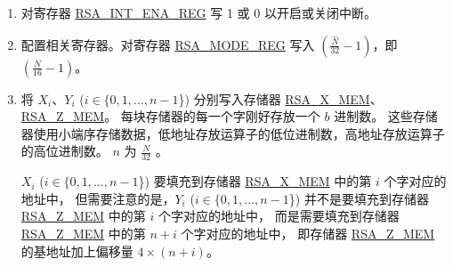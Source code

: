 \documentclass[main\_\_CN.tex]{subfiles}
\begin{document}
\begin{enumerate}

    \item 对寄存器 \hyperref[regdesc:RSAINTENAREG]{RSA\_INT\_ENA\_REG} 写 1 或 0 以开启或关闭中断。

    \item 配置相关寄存器。对寄存器 \hyperref[regdesc:RSAMODEREG]{RSA\_MODE\_REG} 写入 \begin{math}( \frac{\hat{N}}{32} - 1 )\end{math}，即 \begin{math}(  \frac{N}{16} - 1 )\end{math}。

    \item 将 \begin{math}{X}_{i}\end{math}、\begin{math}{Y}_{i}\end{math} (\begin{math}i \in \{ 0, 1, \dots, n-1 \end{math}\}) 分别写入存储器 \hyperref[regdesc:RSAmemory]{RSA\_X\_MEM}、\hyperref[regdesc:RSAmemory]{RSA\_Z\_MEM}。
        每块存储器的每一个字刚好存放一个 \begin{math}b\end{math} 进制数。
        这些存储器使用小端序存储数据，低地址存放运算子的低位进制数，高地址存放运算子的高位进制数。
        \begin{math}n\end{math} 为 \begin{math} \frac{N}{32} \end{math} 。

         \begin{math}{X}_{i}\end{math} (\begin{math}i \in \{ 0, 1, \dots, n-1 \end{math}\}) 要填充到存储器 \hyperref[regdesc:RSAmemory]{RSA\_X\_MEM} 中的第 \begin{math}i\end{math} 个字对应的地址中，
        但需要注意的是，\begin{math}{Y}_{i}\end{math} (\begin{math}i\in\{ 0, 1, \dots, n-1 \end{math}\}) 并不是要填充到存储器 \hyperref[regdesc:RSAmemory]{RSA\_Z\_MEM} 中的第 \begin{math}i\end{math} 个字对应的地址中，
        而是需要填充到存储器 \hyperref[regdesc:RSAmemory]{RSA\_Z\_MEM} 中的第 \begin{math}n+i\end{math} 个字对应的地址中，
        即存储器 \hyperref[regdesc:RSAmemory]{RSA\_Z\_MEM} 的基地址加上偏移量 \begin{math}4 \times (n+i) \end{math}。


\end{enumerate}
\end{document}
